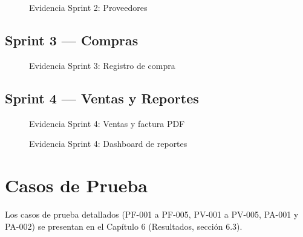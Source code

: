 \documentclass[12pt, letterpaper]{report}
\begin{document}
\begin{figure}[H]
\centering
{}
\caption{Evidencia Sprint 2: Proveedores}
\end{figure}

\section*{Sprint 3 --- Compras}

\begin{figure}[H]
\centering
{}
\caption{Evidencia Sprint 3: Registro de compra}
\end{figure}

\section*{Sprint 4 --- Ventas y Reportes}

\begin{figure}[H]
\centering
{}
\caption{Evidencia Sprint 4: Ventas y factura PDF}
\end{figure}

\begin{figure}[H]
\centering
{}
\caption{Evidencia Sprint 4: Dashboard de reportes}
\end{figure}

\chapter{Casos de Prueba}

Los casos de prueba detallados (PF-001 a PF-005, PV-001 a PV-005, PA-001 y PA-002) se presentan en el Capítulo 6 (Resultados, sección 6.3).
\end{document}
